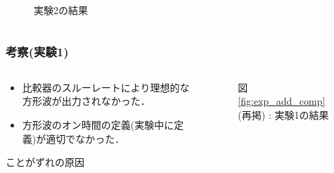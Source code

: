 \documentclass[mathsans]{beamer} %
\begin{document}
\begin{frame}
\begin{columns}
\begin{column}{.5\linewidth}
\begin{figure}
\begin{center}
					\caption{実験2の結果}\label{fig:exp_DCDC_add_comp}
				\end{center}
			\end{figure}
		\end{column}
	\end{columns}
\end{frame}
\begin{frame}
	\frametitle{考察(実験1)}
	\begin{columns}
		\begin{column}{.45\linewidth}
			\begin{itemize}
				\item 比較器のスルーレートにより理想的な方形波が出力されなかった．
				\item 方形波のオン時間の定義(実験中に定義)が適切でなかった．
			\end{itemize}
			ことがずれの原因
		\end{column}
		\begin{column}{.5\linewidth}
			\begin{figure}[htbp]
				\begin{center}
					\vspace{-1em}
					\caption*{図 \ref{fig:exp_add_comp}(再掲) : 実験1の結果}
				\end{center}
			\end{figure}
		\end{column}
	\end{columns}
\end{frame}
\end{document}

